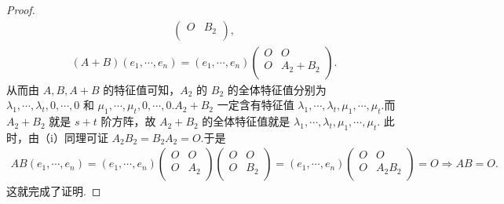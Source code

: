 \documentclass[../../main.tex]{subfiles}%
\begin{document}
\begin{proof}
\begin{align*}
\begin{pmatrix}
O&		B_2\\
\end{pmatrix},
\end{align*}
\begin{align*}
\left( A+B \right) \left( e_1,\cdots ,e_n \right) =\left( e_1,\cdots ,e_n \right) \begin{pmatrix}
O&		O\\
O&		A_2+B_2\\
\end{pmatrix}.
\end{align*}
从而由 $A,B,A+B$ 的特征值可知，$A_2$ 的 $B_2$ 的全体特征值分别为 $\lambda _1,\cdots ,\lambda _t,0,\cdots ,0$ 和 $\mu _1,\cdots ,\mu _t,0,\cdots ,0$.$A_2+B_2$ 一定含有特征值 $\lambda _1,\cdots ,\lambda _t,\mu _1,\cdots ,\mu _t$.而 $A_2+B_2$ 就是 $s+t$ 阶方阵，故 $A_2+B_2$ 的全体特征值就是 $\lambda _1,\cdots ,\lambda _t,\mu _1,\cdots ,\mu _t$.
此时，由（i）同理可证 $A_2B_2=B_2A_2=O$.于是
\begin{align*}
AB\left( e_1,\cdots ,e_n \right) =\left( e_1,\cdots ,e_n \right) \begin{pmatrix}
O&		O\\
O&		A_2\\
\end{pmatrix} \begin{pmatrix}
O&		O\\
O&		B_2\\
\end{pmatrix} =\left( e_1,\cdots ,e_n \right) \begin{pmatrix}
O&		O\\
O&		A_2B_2\\
\end{pmatrix} =O\Rightarrow AB=O.
\end{align*}
这就完成了证明.
\end{proof}
\end{document}
